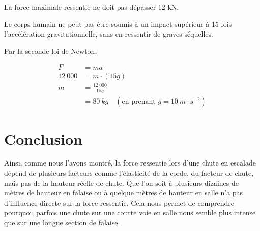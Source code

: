 \documentclass[a4paper,10pt,french]{scrartcl}
\begin{document}
La force maximale ressentie ne doit pas dépasser 12 kN.

Le corps humain ne peut pas être soumis à un impact supérieur à 15 fois l'accélération gravitationnelle, sans en ressentir de graves séquelles.

Par la seconde loi de Newton:

\[
\begin{aligned}
F &= ma \\
12\ 000 &= m\cdot (15g) \\
m &= \frac{12\ 000}{15g} \\
&= 80\ kg \quad (\text{en prenant } g=10 \ m\cdot s^{-2})
\end{aligned}
\]
\section{Conclusion}
Ainsi, comme nous l'avons montré, la force ressentie lors d'une chute en escalade dépend de plusieurs facteurs comme l'élasticité de la corde, du facteur de chute, mais pas de la hauteur réelle de chute. Que l'on soit à plusieurs dizaines de mètres de hauteur en falaise ou à quelque mètres de hauteur en salle n'a pas d'influence directe sur la force ressentie. Cela nous permet de comprendre pourquoi, parfois une chute sur une courte voie en salle nous semble plus intense que sur une longue section de falaise.

\end{document}
